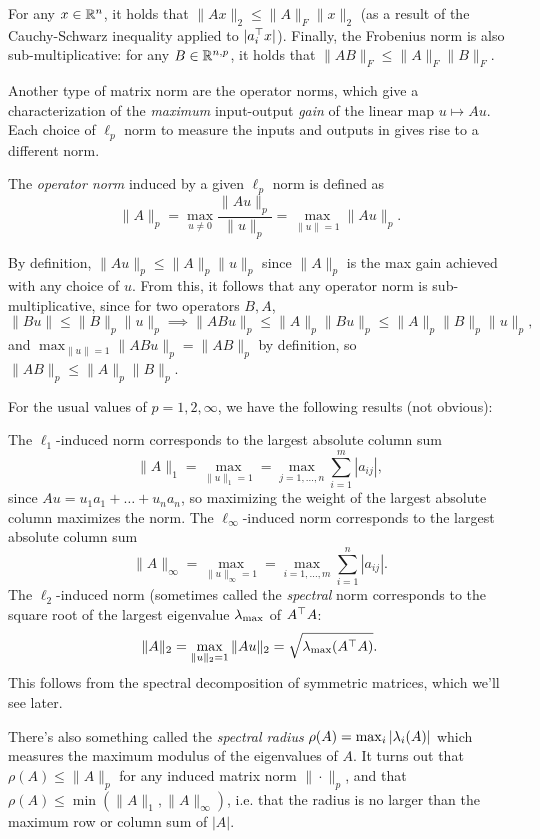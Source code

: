 \documentclass[11 pt]{scrartcl}
\begin{document}
For any $x\in \mathbb R^n$, it holds that $\|Ax\|_2 \leq \|A\|_F \|x\|_2$ (as a result of the Cauchy-Schwarz inequality applied to $|a_i^\top x|$).
Finally, the Frobenius norm is also sub-multiplicative: for any $B\in \mathbb R^{n,p}$, it holds that $\|AB\|_F \leq \|A\|_F \|B\|_F$. 

Another type of matrix norm are the operator norms, which give a characterization of the \emph{maximum} input-output \emph{gain} of the linear map $u\mapsto Au$. 
Each choice of $\ell_p$ norm to measure the inputs and outputs in gives rise to a different norm. 
\begin{definition}
    The \emph{operator norm} induced by a given $\ell_p$ norm is defined as 
    \[ \|A\|_p = \max_{u\not= 0} \dfrac{\|Au\|_p}{\|u\|_p} = \max_{\|u\|=1} \|Au\|_p.\] 
\end{definition}

By definition, $\|Au\|_p \leq \|A\|_p \|u\|_p$ since $\|A\|_p$ is the max gain achieved with any choice of $u$. 
From this, it follows that any operator norm is sub-multiplicative, since for two operators $B,A$, 
\[ \|Bu\| \leq \|B\|_p \|u\|_p \implies \|ABu\|_p \leq \|A\|_p \|Bu\|_p \leq \|A\|_p\|B\|_p \|u\|_p,\]
and $\max_{\|u\|=1} \|ABu\|_p = \|AB\|_p $ by definition, so $\|AB\|_p \leq \|A\|_p \|B\|_p$. 

For the usual values of $p = 1, 2, \infty$, we have the following results (not obvious): 
\begin{itemize}
    \ii The $\ell_1$-induced norm corresponds to the largest absolute column sum 
    \[ \|A \|_1 = \max_{\|u\|_1 = 1} = \max_{j=1,\dots, n} \sum_{i=1}^m |a_{ij}|,\] 
    since $Au = u_1a_1 + \dots + u_na_n$, so maximizing the weight of the largest absolute column maximizes the norm. 
    \ii The $\ell_\infty$-induced norm corresponds to the largest absolute column sum 
    \[ \|A \|_\infty = \max_{\|u\|_\infty = 1} = \max_{i=1,\dots, m} \sum_{i=1}^n |a_{ij}|.\] 
    \ii The $\ell_2$-induced norm (sometimes called the \emph{spectral} norm corresponds to the square root of the largest eigenvalue $\lambda_{\max}$ of $A^\top A$: 
    \[ \|A\|_2 = \max_{\|u\|_2 = 1} \|Au\|_2 = \sqrt{\lambda_{\max} (A^\top A)}.\] 
    This follows from the spectral decomposition of symmetric matrices, which we'll see later.
\end{itemize}

There's also something called the \emph{spectral radius} $\rho(A) = \max_i |\lambda_i(A)|$ which measures the maximum modulus of the eigenvalues of $A$.
It turns out that $\rho(A) \leq \|A\|_p$ for any induced matrix norm $\|\cdot \|_p$, and that $\rho(A) \leq \min(\|A\|_1, \|A\|_\infty)$, i.e. that the radius is no larger than the maximum row or column sum of $|A|$. 
\end{document}
